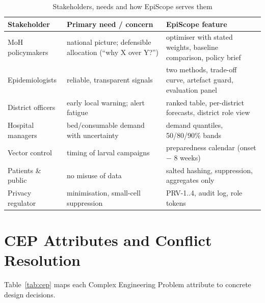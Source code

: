 \documentclass[conference]{IEEEtran}
\begin{document}
\begin{table}[t]\centering\footnotesize
\caption{Stakeholders, needs and how EpiScope serves them}\label{tab:stake}
\begin{tabular}{@{}p{1.7cm}p{3.1cm}p{2.9cm}@{}}\toprule
Stakeholder & Primary need / concern & EpiScope feature\\\midrule
MoH policymakers & national picture; defensible allocation (``why X over Y?'') & optimiser with stated weights, baseline comparison, policy brief\\
Epidemiologists & reliable, transparent signals & two methods, trade-off curve, artefact guard, evaluation panel\\
District officers & early local warning; alert fatigue & ranked table, per-district forecasts, district role view\\
Hospital managers & bed/consumable demand with uncertainty & demand quantiles, 50/80/90\% bands\\
Vector control & timing of larval campaigns & preparedness calendar (onset $-$ 8 weeks)\\
Patients \& public & no misuse of data & salted hashing, suppression, aggregates only\\
Privacy regulator & minimisation, small-cell suppression & PRV-1..4, audit log, role tokens\\\bottomrule
\end{tabular}\end{table}

\section{CEP Attributes and Conflict Resolution}\label{sec:cep}
Table~\ref{tab:cep} maps each Complex Engineering Problem attribute to concrete design decisions.
\end{document}
